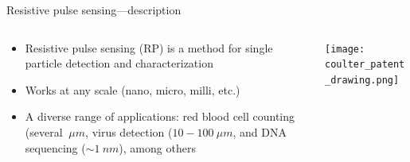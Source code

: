 \begin{frame}[c]{Resistive pulse sensing---description}
	
	\begin{columns}[t]
		\begin{column}[T]{2.75in}
	
			\begin{itemize}
				\item Resistive pulse sensing (RP) is a method for single particle detection and characterization
				\item Works at any scale (nano, micro, milli, etc.)
				\item A diverse range of applications: red blood cell counting (several $\SI{}{\mu m}$, virus detection ($10-\SI{100}{\mu m}$, and DNA sequencing ($\sim\SI{1}{nm}$), among others
			\end{itemize}
	
		\end{column}
		
		\begin{column}[T]{1.75in}
			\texttt{[image: coulter\_patent\_drawing.png]}
		\end{column}
		
	\end{columns}

	
\end{frame}





